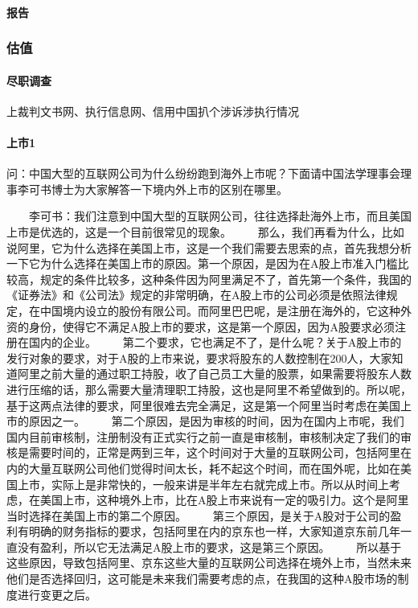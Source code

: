 \documentclass[letterpaper,11pt,english]{sphinxmanual}
\begin{document}
\paragraph{报告}
\label{\detokenize{chapter_skill/research:id10}}


\subsubsection{估值}
\label{\detokenize{chapter_skill/Valuation:id1}}\label{\detokenize{chapter_skill/Valuation::doc}}

\paragraph{尽职调查}
\label{\detokenize{chapter_skill/Valuation:id2}}
上裁判文书网、执行信息网、信用中国扒个涉诉涉执行情况


\paragraph{上市1\sphinxfootnotemark[205]}
\label{\detokenize{chapter_skill/Valuation:id3}}%
\begin{footnotetext}[205]\sphinxAtStartFootnote
{}
%
\end{footnotetext}\ignorespaces 
问：中国大型的互联网公司为什么纷纷跑到海外上市呢？下面请中国法学理事会理事李可书博士为大家解答一下境内外上市的区别在哪里。

　　李可书：我们注意到中国大型的互联网公司，往往选择赴海外上市，而且美国上市是优选的，这是一个目前很常见的现象。
　　那么，我们再看为什么，比如说阿里，它为什么选择在美国上市，这是一个我们需要去思索的点，首先我想分析一下它为什么选择在美国上市的原因。第一个原因，是因为在A股上市准入门槛比较高，规定的条件比较多，这种条件因为阿里满足不了，首先第一个条件，我国的《证券法》和《公司法》规定的非常明确，在A股上市的公司必须是依照法律规定，在中国境内设立的股份有限公司。而阿里巴巴呢，是注册在海外的，它这种外资的身份，使得它不满足A股上市的要求，这是第一个原因，因为A股要求必须注册在国内的企业。
　　第二个要求，它也满足不了，是什么呢？关于A股上市的发行对象的要求，对于A股的上市来说，要求将股东的人数控制在200人，大家知道阿里之前大量的通过职工持股，收了自己员工大量的股票，如果需要将股东人数进行压缩的话，那么需要大量清理职工持股，这也是阿里不希望做到的。所以呢，基于这两点法律的要求，阿里很难去完全满足，这是第一个阿里当时考虑在美国上市的原因之一。
　　第二个原因，是因为审核的时间，因为在国内上市呢，我们国内目前审核制，注册制没有正式实行之前一直是审核制，审核制决定了我们的审核是需要时间的，正常是两到三年，这个时间对于大量的互联网公司，包括阿里在内的大量互联网公司他们觉得时间太长，耗不起这个时间，而在国外呢，比如在美国上市，实际上是非常快的，一般来讲是半年左右就完成上市。所以从时间上考虑，在美国上市，这种境外上市，比在A股上市来说有一定的吸引力。这个是阿里当时选择在美国上市的第二个原因。
　　第三个原因，是关于A股对于公司的盈利有明确的财务指标的要求，包括阿里在内的京东也一样，大家知道京东前几年一直没有盈利，所以它无法满足A股上市的要求，这是第三个原因。
　　所以基于这些原因，导致包括阿里、京东这些大量的互联网公司选择在境外上市，当然未来他们是否选择回归，这可能是未来我们需要考虑的点，在我国的这种A股市场的制度进行变更之后。
\end{document}
